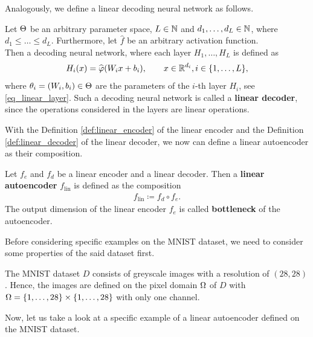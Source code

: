 Analogously, we define a linear decoding neural network as follows.

\begin{definition}\label{def:linear_decoder}
Let $\operatorname{\Theta}$ be an arbitrary parameter space, $L\in \operatorname{\mathbb{N}}$ and $d_1,\ldots,d_L \in \operatorname{\mathbb{N}}$, where $d_1\leq \ldots \leq d_L$. Furthermore, let $\hat{f}$ be an arbitrary activation function.\\
Then a decoding neural network, where each layer $H_1,\ldots, H_L$ is defined as
\begin{align*}
H_i(x) = \widehat{\operatorname{\varphi}}(W_ix + b_i), \qquad x \in \operatorname{\mathbb{R}}^{d_i}, i \in \{1,\ldots, L\},
\end{align*}
where $\theta_i=(W_i, b_i)\in\operatorname{\Theta}$ are the parameters of the $i$-th layer $H_i$, see \eqref{eq_linear_layer}. Such a decoding neural network is called a \textbf{linear decoder}, since the operations considered in the layers are linear operations.
\end{definition}

With the Definition \ref{def:linear_encoder} of the linear encoder and the Definition \ref{def:linear_decoder} of the linear decoder, we now can define a linear autoencoder as their composition.

\begin{definition}
Let $f_e$ and $f_d$ be a linear encoder and a linear decoder. Then a \textbf{linear autoencoder} $f_{\text{lin}}$ is defined as the composition
\begin{align*}
f_{\text{lin}} \coloneqq f_d \circ f_e.
\end{align*}
The output dimension of the linear encoder $f_e$ is called \textbf{bottleneck} of the autoencoder.
\end{definition}

Before considering specific examples on the MNIST dataset, we need to consider some properties of the said dataset first.

\begin{remark}\label{remark:mnist}
The MNIST dataset $D$ consists of greyscale images with a resolution of $(28,28)$. Hence, the images are defined on the pixel domain $\Omega$ of $D$ with $\Omega=\{1,\ldots,28\}\times\{1,\ldots,28\}$ with only one channel.
\end{remark}

Now, let us take a look at a specific example of a linear autoencoder defined on the MNIST dataset.

